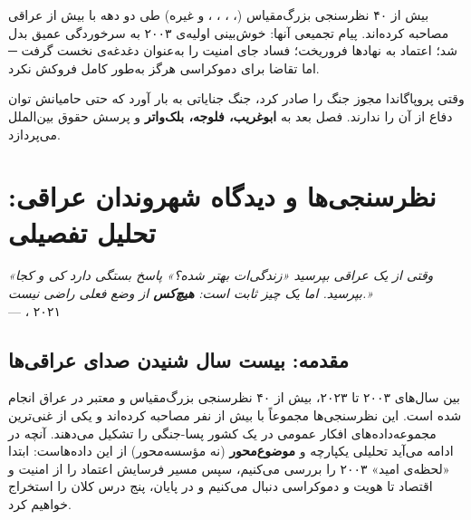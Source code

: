 
\begin{chaptersummary}
  بیش از ۴۰ نظرسنجی بزرگ‌مقیاس (، ،
  ، ،  و غیره) طی دو دهه
  با بیش از  عراقی مصاحبه کرده‌اند.
  پیام تجمیعی آنها: خوش‌بینی اولیه‌ی ۲۰۰۳ به سرخوردگی عمیق
  بدل شد؛ اعتماد به نهادها فروریخت؛ فساد جای امنیت را
  به‌عنوان دغدغه‌ی نخست گرفت ─ اما تقاضا برای دموکراسی
  هرگز به‌طور کامل فروکش نکرد.
\end{chaptersummary}

\begin{chapterbridge}
  وقتی پروپاگاندا مجوز جنگ را صادر کرد،
  جنگ جنایاتی به بار آورد که حتی حامیانش
  توان دفاع از آن را ندارند.
  فصل بعد به \textbf{ابوغریب، فلوجه، بلک‌واتر}
  و پرسش حقوق بین‌الملل می‌پردازد.
\end{chapterbridge}

\chapter{نظرسنجی‌ها و دیدگاه شهروندان عراقی: تحلیل تفصیلی}

\begin{epigraphbox}
\textit{«وقتی از یک عراقی بپرسید
\textup{«}زندگی‌ات بهتر شده؟\textup{»}
پاسخ بستگی دارد کی و کجا بپرسید.
اما یک چیز ثابت است:
\textbf{هیچ‌کس} از وضع فعلی راضی نیست.»}\\[4pt]
\hfill --- ، ۲۰۲۱
\end{epigraphbox}


\section{مقدمه: بیست سال شنیدن صدای عراقی‌ها}

بین سال‌های ۲۰۰۳ تا ۲۰۲۳، بیش از ۴۰ نظرسنجی بزرگ‌مقیاس و معتبر
در عراق انجام شده است.
این نظرسنجی‌ها مجموعاً با بیش از  نفر مصاحبه
کرده‌اند و یکی از غنی‌ترین مجموعه‌داده‌های افکار عمومی در یک
کشور پسا-جنگی را تشکیل می‌دهند.
آنچه در ادامه می‌آید تحلیلی یکپارچه و \textbf{موضوع‌محور}
(نه مؤسسه‌محور) از این داده‌هاست:
ابتدا «لحظه‌ی امید» ۲۰۰۳ را بررسی می‌کنیم،
سپس مسیر فرسایش اعتماد را از امنیت و اقتصاد تا هویت و دموکراسی
دنبال می‌کنیم و در پایان، پنج درس کلان را استخراج خواهیم کرد.


